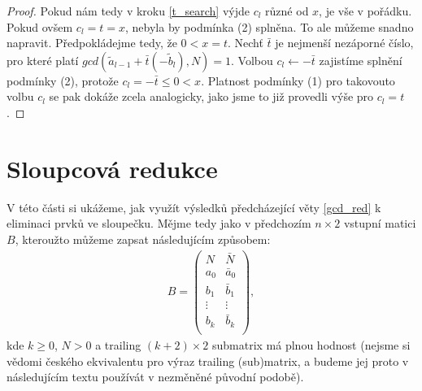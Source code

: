 \begin{proof}
Pokud nám tedy v kroku \ref{t_search} výjde $ c_l $ různé od $ x $, je vše v pořádku.
Pokud ovšem $ c_l = t = x $, nebyla by podmínka (2) splněna.
To ale můžeme snadno napravit. Předpokládejme tedy, že $ 0 < x = t $.
Nechť $ \bar{t} $ je nejmenší nezáporné číslo, pro které platí
$ gcd(\tilde{a}_{l-1} + \bar{t} (-\tilde{b}_{l}), N) = 1 $. Volbou $ c_l \leftarrow -\bar{t}$
zajistíme splnění podmínky (2), protože $ c_l = -\bar{t} \leq 0 < x $. Platnost
podmínky (1) pro takovouto volbu $ c_l $ se pak dokáže zcela analogicky, jako
jsme to již provedli výše pro $ c_l = t $.
\end{proof}

\section{Sloupcová redukce}

V této části si ukážeme, jak využít výsledků předcházející věty \ref{gcd_red} k
eliminaci prvků ve sloupečku. Mějme tedy jako v předchozím $ n \times 2 $
vstupní matici $ B $, kteroužto můžeme zapsat následujícím způsobem:
\begin{align} \label{B_col}
B =
    \begin{pmatrix}
        N & \bar{N} \\
        a_0 & \bar{a}_0  \\
        b_1 & \bar{b}_1  \\
        \vdots & \vdots  \\
        b_k & \bar{b}_k  \\
    \end{pmatrix}
,
\end{align}
kde $ k \geq 0 $, $ N > 0 $ a trailing $ (k+2) \times 2 $ submatrix má plnou
hodnost (nejsme si vědomi českého ekvivalentu pro výraz trailing (sub)matrix,
a budeme jej proto v následujícím textu používát v nezměněné původní podobě).

